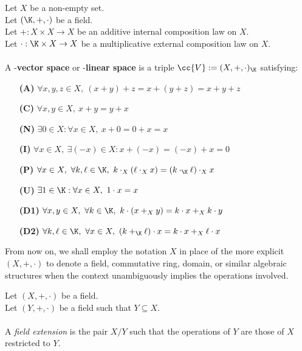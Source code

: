 \begin{definition-pre}
    \label{def:vector_space}
    Let $X$ be a non-empty set. \\
    Let $(\K,+,\cdot)$ be a field. \\
    Let $+: X\times X \to X$ be an additive internal composition law on $X$. \\
    Let $\cdot: \K\times X \to X$ be a multiplicative external composition law on $X$. \\\\
    A \K-\textbf{vector space} or \K-\textbf{linear space} is a triple $\cc{V}:= (X, +, \cdot)_{\K}$ satisfying:
    \begin{enumerate}
        \item [\textbf{(A)}] $\forall x,y,z\in X,\ (x+y)+z= x+(y+z) = x+y+z$
        \item [\textbf{(C)}] $\forall x,y\in X,\ x+y = y+x$
        \item [\textbf{(N)}] $\exists 0 \in X : \forall x \in X,\ x+0 = 0+x = x$
        \item [\textbf{(I)}] $\forall x \in X,\ \exists (-x)\in X: x+(-x) = (-x)+x = 0$
        \item [\textbf{(P)}] $\forall x \in X,\ \forall k,\ell \in \K,\ k\cdot_X(\ell\cdot_X x)= (k\cdot_{\K}\ell)\cdot_X x$
        \item [\textbf{(U)}] $\exists 1 \in \K : \forall x \in X,\ 1\cdot x = x$
        \item [\textbf{(D1)}] $\forall x,y \in X,\ \forall k\in \K,\ k\cdot(x+_Xy)=k\cdot x+_Xk\cdot y$
        \item [\textbf{(D2)}] $\forall k,\ell \in \K,\ \forall x\in X,\ (k+_\K\ell)\cdot x=k\cdot x+_X\ell\cdot x$
    \end{enumerate}
\end{definition-pre}

From now on, we shall employ the notation $X$ in place of the more explicit $(X, +, \cdot)$ to denote a field,
commutative ring, domain, or similar algebraic structures when the context unambiguously implies the operations involved.

\begin{definition-pre}
    \label{def:field_extension}
    Let $(X, +, \cdot)$ be a field. \\
    Let $(Y, +, \cdot)$ be a field such that $Y \subseteq X$. \\\\
    A \textit{field extension} is the pair $X/Y$ such that the operations of $Y$
    are those of $X$ restricted to $Y$.
\end{definition-pre}


